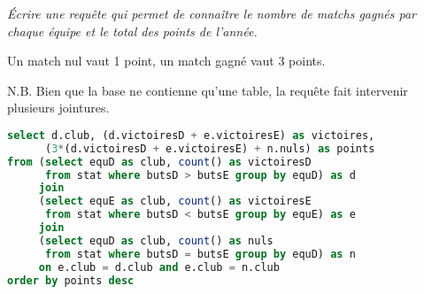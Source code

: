 \begin{Exercise}{\it 
Écrire une requête qui permet de connaître le nombre de matchs gagnés par chaque équipe et le total des points de l'année. 

Un match nul vaut 1 point, un match gagné vaut 3 points.

N.B. Bien que la base ne contienne qu'une table, la requête fait intervenir plusieurs jointures.}
\end{Exercise}
\begin{Answer}
\begin{lstlisting}[language=SQL]
select d.club, (d.victoiresD + e.victoiresE) as victoires,
      (3*(d.victoiresD + e.victoiresE) + n.nuls) as points
from (select equD as club, count() as victoiresD
      from stat where butsD > butsE group by equD) as d
	 join
	 (select equE as club, count() as victoiresE
      from stat where butsD < butsE group by equE) as e
	 join
	 (select equD as club, count() as nuls
      from stat where butsD = butsE group by equD) as n
	 on e.club = d.club and e.club = n.club
order by points desc
\end{lstlisting}
\end{Answer}
